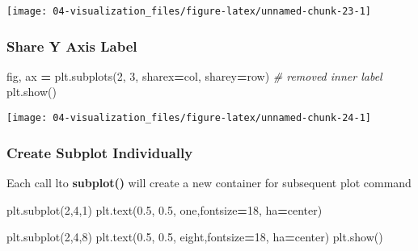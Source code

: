 \documentclass[
]{book}
\newenvironment{Shaded}{\begin{snugshade}}{\end{snugshade}}
\newcommand{\CommentTok}[1]{\textcolor[rgb]{0.37,0.37,0.37}{\textit{#1}}}
\newcommand{\DecValTok}[1]{\textcolor[rgb]{0.06,0.06,0.06}{#1}}
\newcommand{\FloatTok}[1]{\textcolor[rgb]{0.06,0.06,0.06}{#1}}
\newcommand{\NormalTok}[1]{#1}
\newcommand{\OperatorTok}[1]{\textcolor[rgb]{0.43,0.43,0.43}{\textbf{#1}}}
\newcommand{\StringTok}[1]{\textcolor[rgb]{0.5,0.5,0.5}{#1}}
\begin{document}
\texttt{[image: 04-visualization\_files/figure-latex/unnamed-chunk-23-1]}

\hypertarget{share-y-axis-label}{%
\subsubsection{Share Y Axis Label}\label{share-y-axis-label}}

\begin{Shaded}
\begin{Highlighting}[]
\NormalTok{fig, ax }\OperatorTok{=}\NormalTok{ plt.subplots(}\DecValTok{2}\NormalTok{, }\DecValTok{3}\NormalTok{, sharex}\OperatorTok{=}\StringTok{\textquotesingle{}col\textquotesingle{}}\NormalTok{, sharey}\OperatorTok{=}\StringTok{\textquotesingle{}row\textquotesingle{}}\NormalTok{) }\CommentTok{\# removed inner label}
\NormalTok{plt.show()}
\end{Highlighting}
\end{Shaded}

\texttt{[image: 04-visualization\_files/figure-latex/unnamed-chunk-24-1]}

\hypertarget{create-subplot-individually}{%
\subsubsection{Create Subplot Individually}\label{create-subplot-individually}}

Each call lto \textbf{subplot()} will create a new container for subsequent plot command

\begin{Shaded}
\begin{Highlighting}[]
\NormalTok{plt.subplot(}\DecValTok{2}\NormalTok{,}\DecValTok{4}\NormalTok{,}\DecValTok{1}\NormalTok{)}
\NormalTok{plt.text(}\FloatTok{0.5}\NormalTok{, }\FloatTok{0.5}\NormalTok{, }\StringTok{\textquotesingle{}one\textquotesingle{}}\NormalTok{,fontsize}\OperatorTok{=}\DecValTok{18}\NormalTok{, ha}\OperatorTok{=}\StringTok{\textquotesingle{}center\textquotesingle{}}\NormalTok{)}

\NormalTok{plt.subplot(}\DecValTok{2}\NormalTok{,}\DecValTok{4}\NormalTok{,}\DecValTok{8}\NormalTok{)}
\NormalTok{plt.text(}\FloatTok{0.5}\NormalTok{, }\FloatTok{0.5}\NormalTok{, }\StringTok{\textquotesingle{}eight\textquotesingle{}}\NormalTok{,fontsize}\OperatorTok{=}\DecValTok{18}\NormalTok{, ha}\OperatorTok{=}\StringTok{\textquotesingle{}center\textquotesingle{}}\NormalTok{)}
\NormalTok{plt.show()}
\end{Highlighting}
\end{Shaded}
\end{document}
